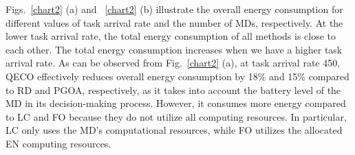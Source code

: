 \documentclass[12pt,draftclsnofoot,onecolumn]{IEEEtran}
\begin{document}
Figs.~\ref{chart2} (a) and ~\ref{chart2} (b) illustrate the overall energy consumption for different values of task arrival rate and the number of MDs, respectively. At the lower task arrival rate, the total energy consumption of all methods is close to each other. The total energy consumption increases when we have a higher task arrival rate.  
As can be observed from Fig.~\ref{chart2} (a), at task arrival rate 450, QECO effectively reduces overall energy consumption by 18\% and 15\% compared to RD and PGOA, respectively, as it takes into account the battery level of the MD in its decision-making process. However, it consumes more energy compared to LC and FO because they do not utilize all computing resources. In particular, LC only uses the MD's computational resources, while FO utilizes the allocated EN computing resources.
\end{document}
